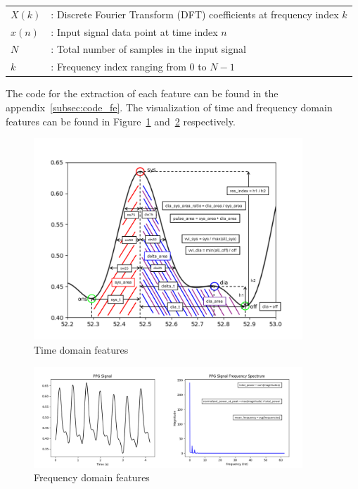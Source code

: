 \begin{flushleft}
    \small
    \begin{tabular}{ll}
        $X(k)$ & : Discrete Fourier Transform (DFT) coefficients at frequency index $k$ \\
        $x(n)$ & : Input signal data point at time index $n$                            \\
        $N$    & : Total number of samples in the input signal                          \\
        $k$    & : Frequency index ranging from $0$ to $N-1$                            \\
    \end{tabular}
\end{flushleft}

The code for the extraction of each feature can be found in the appendix~\ref{subsec:code_fe}.
The visualization of time and frequency domain features can be found in Figure~\ref{fig:td_feats} and~\ref{fig:fd_feats} respectively.

\begin{figure}[h]
    \includegraphics[width=0.9\textwidth]{images/methods/feats}
    \caption{Time domain features}
    \label{fig:td_feats}
\end{figure}

\begin{figure}[h]
    \includegraphics[width=0.9\textwidth]{images/methods/median_fft}
    \caption{Frequency domain features}
    \label{fig:fd_feats}
\end{figure}

